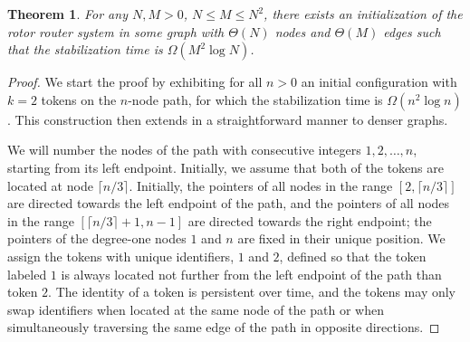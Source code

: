 \documentclass{article}[11pt,letter]
\newtheorem{theorem}[definition]{Theorem}
\begin{document}
\begin{theorem}
\label{lower_bound}
For any $N, M > 0$, $N \leq M \leq N^2$, there exists an initialization of the rotor router system in some graph with $\Theta(N)$ nodes and $\Theta(M)$ edges such that the stabilization time is $\Omega(M^2 \log N)$.
\end{theorem}
\begin{proof}
We start the proof by exhibiting for all $n>0$ an initial configuration with $k=2$ tokens on the $n$-node path, for which the stabilization time is $\Omega(n^2\log n)$. This construction then extends in a straightforward manner to denser graphs.

We will number the nodes of the path with consecutive integers $1,2,\ldots, n$, starting from its left endpoint. Initially, we assume that both of the tokens are located at node $\lceil n/3 \rceil$. Initially, the pointers of all nodes in the range $[2, \lceil n/3 \rceil]$ are directed towards the left endpoint of the path, and the pointers of all nodes in the range $[\lceil n/3 \rceil+1, n-1]$ are directed towards the right endpoint; the pointers of the degree-one nodes $1$ and $n$ are fixed in their unique position. We assign the tokens with unique identifiers, $1$ and $2$, defined so that the token labeled $1$ is always located not further from the left endpoint of the path than token $2$. The identity of a token is persistent over time, and the tokens may only swap identifiers when located at the same node of the path or when simultaneously traversing the same edge of the path in opposite directions.


\end{proof}
\end{document}
